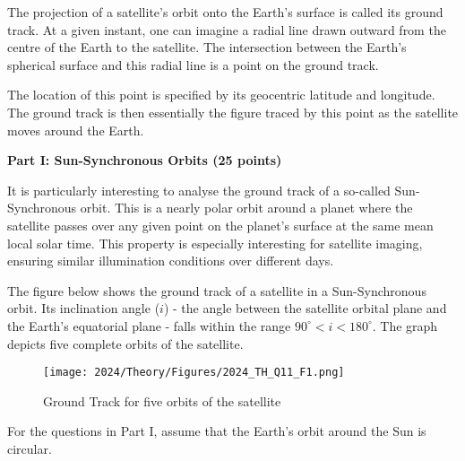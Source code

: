 The projection of a satellite's orbit onto the Earth's surface is called its ground track. At a given instant, one can imagine a radial line drawn outward from the centre of the Earth to the satellite. The intersection between the Earth's spherical surface and this radial line is a point on the ground track.

The location of this point is specified by its geocentric latitude and longitude. The ground track is then essentially the figure traced by this point as the satellite moves around the Earth.

\textbf{Part I: Sun-Synchronous Orbits (25 points)}

It is particularly interesting to analyse the ground track of a so-called Sun-Synchronous orbit. This is a nearly polar orbit around a planet where the satellite passes over any given point on the planet's surface at the same mean local solar time. This property is especially interesting for satellite imaging, ensuring similar illumination conditions over different days.

The figure below shows the ground track of a satellite in a Sun-Synchronous orbit. Its inclination angle ($i$) - the angle between the satellite orbital plane and the Earth's equatorial plane - falls within the range $90^{\circ}<i<180^{\circ}$. The graph depicts five complete orbits of the satellite.

\begin{figure}[H]
    \centering
    \texttt{[image: 2024/Theory/Figures/2024\_TH\_Q11\_F1.png]}
    \caption{Ground Track for five orbits of the satellite}
\end{figure}

For the questions in Part I, assume that the Earth's orbit around the Sun is circular.
 
